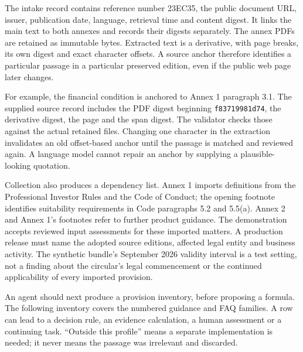 \documentclass[12pt,a4paper,oneside,openany]{book}
\begin{document}
The intake record contains reference number 23EC35, the public document URL,
issuer, publication date, language, retrieval time and content digest. It
links the main text to both annexes and records their digests separately.
The annex PDFs are retained as immutable bytes. Extracted text is a derivative,
with page breaks, its own digest and exact character offsets. A source anchor
therefore identifies a particular passage in a particular preserved edition,
even if the public web page later changes.

For example, the financial condition is anchored to Annex 1 paragraph 3.1.
The supplied source record includes the PDF digest beginning
\texttt{f83719981d74}, the derivative digest, the page and the span digest.
The validator checks those against the actual retained files. Changing one
character in the extraction invalidates an old offset-based anchor until the
passage is matched and reviewed again. A language model cannot repair an anchor
by supplying a plausible-looking quotation.

Collection also produces a dependency list. Annex 1 imports definitions from the
Professional Investor Rules and the Code of Conduct; the opening footnote
identifies suitability requirements in Code paragraphs 5.2 and 5.5(a). Annex 2
and Annex 1's footnotes refer to further product guidance. The demonstration
accepts reviewed input assessments for these imported matters. A production
release must name the adopted source editions, affected legal entity and
business activity. The synthetic bundle's September 2026 validity interval is
a test setting, not a finding about the circular's legal commencement or the
continued applicability of every imported provision.

An agent should next produce a provision inventory, before proposing a formula.
The following inventory covers the numbered guidance and FAQ families. A row
can lead to a decision rule, an evidence calculation, a human assessment or a
continuing task. ``Outside this profile'' means a separate implementation is
needed; it never means the passage was irrelevant and discarded.
\end{document}
